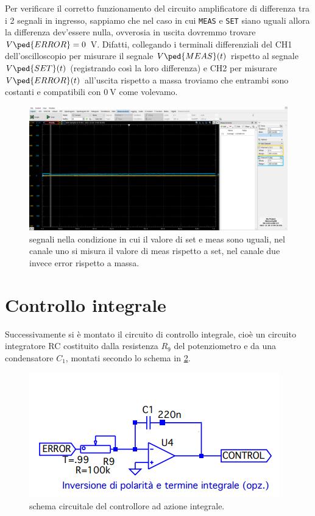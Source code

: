 \documentclass[10pt, a4paper, italian]{article}
\begin{document}
Per verificare il corretto funzionamento del circuito amplificatore di
differenza tra i 2 segnali in ingresso, sappiamo che nel caso in cui
\verb+MEAS+ e \verb+SET+ siano uguali allora la differenza dev'essere nulla,
ovverosia in uscita dovremmo trovare $V\ped{ERROR} = 0$ V.
Difatti, collegando i terminali differenziali del CH1 dell'oscilloscopio
per misurare il segnale $V\ped{MEAS} (t)$ rispetto al segnale $V\ped{SET} (t)$
(registrando così la loro differenza) e CH2 per misurare $V\ped{ERROR} (t)$
all'uscita rispetto a massa troviamo che entrambi sono costanti e compatibili
con $\SI{0}{\V}$ come volevamo.
\begin{figure}[htbp]
    \centering
	\includegraphics[scale=0.4]{meas.same.set}
    \caption{segnali nella condizione in cui il valore di set e meas sono uguali, nel canale uno si misura il valore di meas rispetto a set, nel canale due invece error rispetto a massa.
    \label{fig: meas=set}}
\end{figure}

\section{Controllo integrale}
Successivamente si è montato il circuito di controllo integrale, cioè un
circuito integratore RC costituito dalla resistenza $R_9$ del potenziometro e
da una condensatore $C_1$, montati secondo lo schema in \cref{fig: ctrlint}.
\begin{figure}[htbp]
    \centering
	\includegraphics[scale=0.4]{controlgenint}
    \caption{schema circuitale del controllore ad azione integrale.
    \label{fig: ctrlint}}
\end{figure}
\end{document}
